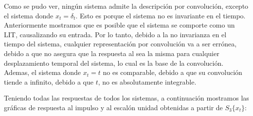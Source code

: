\documentclass[12pt,a4paper]{report}
\begin{document}
\begin{enumerate}[label=\alph*)]
\begin{table}[h!]
\begin{tabular}{|c|c|c|c|}
        \end{tabular}
      \end{table}

      Como se pudo ver, ningún sistema admite la descripción por convolución, excepto el sistema donde $x_t = \delta_t$.
      Esto es porque el sistema no es invariante en el tiempo. Anteriormente mostramos que es posible que el sistema se
      comporte como un LIT, causalizando su entrada. Por lo tanto, debido a la no invarianza en el tiempo del sistema,
      cualquier representación por convolución va a ser errónea, debido a que no asegura que la respuesta al sea la
      misma para cualquier desplazamiento temporal del sistema, lo cual es la base de la convolución. Ademas, el sistema
      donde $x_t = t$ no es comparable, debido a que su convolución tiende a infinito, debido a que $t$, no es
      absolutamente integrable.
      
      \newpage
      Teniendo todas las respuestas de todos los sistemas, a continuación mostramos las gráficas de respuesta al
      impulso y al escalón unidad obtenidas a partir de $S_3\{x_t\}$:


\end{enumerate}
\end{document}
